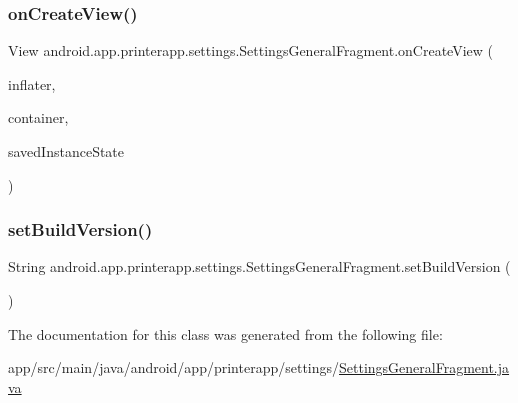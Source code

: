 \subsubsection{\texorpdfstring{on\+Create\+View()}{onCreateView()}}
{\footnotesize\ttfamily View android.\+app.\+printerapp.\+settings.\+Settings\+General\+Fragment.\+on\+Create\+View (\begin{DoxyParamCaption}\item[{Layout\+Inflater}]{inflater,  }\item[{View\+Group}]{container,  }\item[{Bundle}]{saved\+Instance\+State }\end{DoxyParamCaption})}

\mbox{\label{classandroid_1_1app_1_1printerapp_1_1settings_1_1_settings_general_fragment_a60cc1b54a6bc360195c95adec2bddaf8}} 
\subsubsection{\texorpdfstring{set\+Build\+Version()}{setBuildVersion()}}
{\footnotesize\ttfamily String android.\+app.\+printerapp.\+settings.\+Settings\+General\+Fragment.\+set\+Build\+Version (\begin{DoxyParamCaption}{ }\end{DoxyParamCaption})}



The documentation for this class was generated from the following file\+:\begin{DoxyCompactItemize}
\item 
app/src/main/java/android/app/printerapp/settings/\hyperlink{_settings_general_fragment_8java}{Settings\+General\+Fragment.\+java}\end{DoxyCompactItemize}
